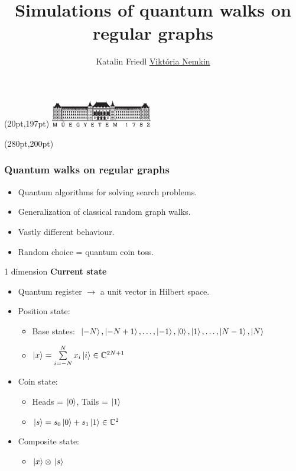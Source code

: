 \documentclass[aspectratio=169]{beamer}
\title{Simulations of quantum walks on regular graphs}
\author[Katalin Friedl, \underline{Viktória Nemkin}]{Katalin Friedl \hspace{2cm} \underline{Viktória Nemkin}}
\date{}
\begin{document}
\begin{frame}

\titlepage

\begin{textblock*}{150pt}(20pt,197pt) %
\includegraphics[width=125pt]{./figures/bme_logo.pdf}
\end{textblock*}
\begin{textblock*}{150pt}(280pt,200pt) %

\end{textblock*}
\end{frame}

\begin{frame}
  \frametitle{Quantum walks on regular graphs}

  \begin{itemize}
      \item Quantum algorithms for solving search problems.
      \item Generalization of classical random graph walks.
      \item Vastly different behaviour.
      \item Random choice = quantum coin toss.
  \end{itemize}
\end{frame}

\begin{frame}{1 dimension}
\textbf{Current state}
\begin{itemize}
    \item Quantum register $\rightarrow$ a unit vector in Hilbert space. \pause
    \item Position state: \pause
    \begin{itemize}
        \item Base states: $\ket{-N},\ket{-N+1},\dots,\ket{-1},\ket{0},\ket{1},\dots,\ket{N-1},\ket{N}$ \pause
        \item $\ket{x} = \sum\limits_{i=-N}^{N}x_i\ket{i} \in{} \mathbb{C}^{2N+1}$ \pause
    \end{itemize}
    \item Coin state: \pause
    \begin{itemize}
        \item Heads = $\ket{0}$, Tails = $\ket{1}$ \pause
        \item $\ket{s} = s_0 \ket{0} + s_1 \ket{1} \in \mathbb{C}^2$ \pause
    \end{itemize}
    \item Composite state: \pause
    \begin{itemize}
        \item $\ket{x}\otimes{}\ket{s}$
    \end{itemize}
\end{itemize}
\end{frame}
\end{document}
